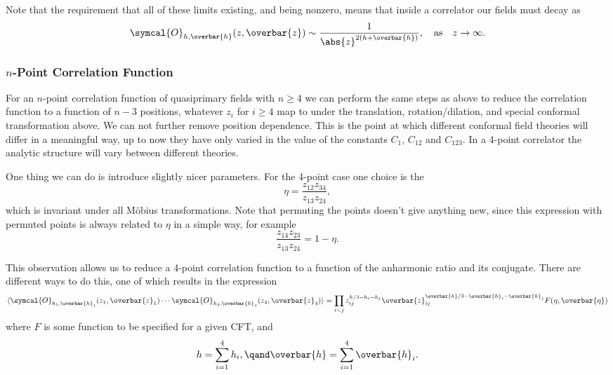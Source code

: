 \documentclass[fleqn]{NotesClass}
\newcommand{\quantumField}[1]{\symcal{#1}}
\DeclarePairedDelimiter{\correlator}{\langle}{\rangle}
\begin{document}
    Note that the requirement that all of these limits existing, and being nonzero, means that inside a correlator our fields must decay as
    \begin{equation}
        \quantumField{O}_{h,\overbar{h}}(z, \overbar{z}) \sim \frac{1}{\abs{z}^{2(h + \overbar{h})}}, \quad \text{as} \quad z \to \infty.
    \end{equation}
    
    \subsubsection{\texorpdfstring{\(n\)}{n}-Point Correlation Function}
    For an \(n\)-point correlation function of quasiprimary fields with \(n \ge 4\) we can perform the same steps as above to reduce the correlation function to a function of \(n - 3\) positions, whatever \(z_i\) for \(i \ge 4\) map to under the translation, rotation/dilation, and special conformal transformation above.
    We can not further remove position dependence.
    This is the point at which different conformal field theories will differ in a meaningful way, up to now they have only varied in the value of the constants \(C_1\), \(C_{12}\) and \(C_{123}\).
    In a 4-point correlator the analytic structure will vary between different theories.
    
    One thing we can do is introduce slightly nicer parameters.
    For the 4-point case one choice is the 
    \begin{equation}
        \eta = \frac{z_{12}z_{34}}{z_{13}z_{24}},
    \end{equation}
    which is invariant under all M\"obius transformations.
    Note that permuting the points doesn't give anything new, since this expression with permuted points is always related to \(\eta\) in a simple way, for example
    \begin{equation}
        \frac{z_{14}z_{23}}{z_{13}z_{24}} = 1 - \eta.
    \end{equation}
    
    This observation allows us to reduce a 4-point correlation function to a function of the anharmonic ratio and its conjugate.
    There are different ways to do this, one of which results in the expression
    \begin{equation}
        \correlator{\quantumField{O}_{h_1, \overbar{h}_1}(z_1, \overbar{z}_1) \dotsb \quantumField{O}_{h_4, \overbar{h}_4}(z_4, \overbar{z}_4)} = \prod_{i < j} z_{ij}^{h/3 - h_i - h_j} \overbar{z}_{ij}^{\overbar{h}/3 - \overbar{h}_i - \overbar{h}_j} F(\eta, \overbar{\eta})
    \end{equation}
    where \(F\) is some function to be specified for a given CFT, and
    \begin{equation}
        h = \sum_{i=1}^4 h_i, \qand \overbar{h} = \sum_{i=1}^4 \overbar{h}_i.
    \end{equation}
    
\end{document}
